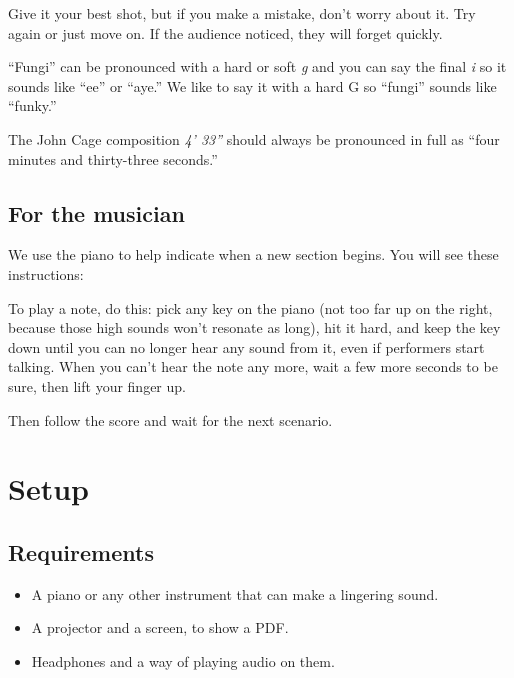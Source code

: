 Give it your best shot, but if you make a mistake, don't worry about it.  Try again or just move on.  If the audience noticed, they will forget quickly.

``Fungi'' can be pronounced with a hard or soft \textit{g} and you can say the final \textit{i} so it sounds like ``ee'' or ``aye.''  We like to say it with a hard G so ``fungi'' sounds like ``funky.''

The John Cage composition \textit{4' 33''} should always be pronounced in full as ``four minutes and thirty-three seconds.''

\subsection*{For the musician}

We use the piano to help indicate when a new section begins.  You will see these instructions:


To play a note, do this:  pick any key on the piano (not too far up on the right, because those high sounds won't resonate as long), hit it hard, and keep the key down until you can no longer hear any sound from it, even if performers start talking.  When you can't hear the note any more, wait a few more seconds to be sure, then lift your finger up.

Then follow the score and wait for the next scenario.

\newpage

\section{Setup}

\subsection*{Requirements}

\begin{itemize}

  \item A piano or any other instrument that can make a lingering sound.
  \item A projector and a screen, to show a PDF.
  \item Headphones and a way of playing audio on them.

\end{itemize}

